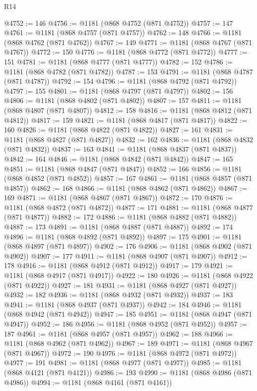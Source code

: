 \begin{lexlean}{R14}
\begin{coremodule}
@4752 := 146
@4756 := @1181 (@868 @4752 (@871 @4752))
@4757 := 147
@4761 := @1181 (@868 @4757 (@871 @4757))
@4762 := 148
@4766 := @1181 (@868 @4762 (@871 @4762))
@4767 := 149
@4771 := @1181 (@868 @4767 (@871 @4767))
@4772 := 150
@4776 := @1181 (@868 @4772 (@871 @4772))
@4777 := 151
@4781 := @1181 (@868 @4777 (@871 @4777))
@4782 := 152
@4786 := @1181 (@868 @4782 (@871 @4782))
@4787 := 153
@4791 := @1181 (@868 @4787 (@871 @4787))
@4792 := 154
@4796 := @1181 (@868 @4792 (@871 @4792))
@4797 := 155
@4801 := @1181 (@868 @4797 (@871 @4797))
@4802 := 156
@4806 := @1181 (@868 @4802 (@871 @4802))
@4807 := 157
@4811 := @1181 (@868 @4807 (@871 @4807))
@4812 := 158
@4816 := @1181 (@868 @4812 (@871 @4812))
@4817 := 159
@4821 := @1181 (@868 @4817 (@871 @4817))
@4822 := 160
@4826 := @1181 (@868 @4822 (@871 @4822))
@4827 := 161
@4831 := @1181 (@868 @4827 (@871 @4827))
@4832 := 162
@4836 := @1181 (@868 @4832 (@871 @4832))
@4837 := 163
@4841 := @1181 (@868 @4837 (@871 @4837))
@4842 := 164
@4846 := @1181 (@868 @4842 (@871 @4842))
@4847 := 165
@4851 := @1181 (@868 @4847 (@871 @4847))
@4852 := 166
@4856 := @1181 (@868 @4852 (@871 @4852))
@4857 := 167
@4861 := @1181 (@868 @4857 (@871 @4857))
@4862 := 168
@4866 := @1181 (@868 @4862 (@871 @4862))
@4867 := 169
@4871 := @1181 (@868 @4867 (@871 @4867))
@4872 := 170
@4876 := @1181 (@868 @4872 (@871 @4872))
@4877 := 171
@4881 := @1181 (@868 @4877 (@871 @4877))
@4882 := 172
@4886 := @1181 (@868 @4882 (@871 @4882))
@4887 := 173
@4891 := @1181 (@868 @4887 (@871 @4887))
@4892 := 174
@4896 := @1181 (@868 @4892 (@871 @4892))
@4897 := 175
@4901 := @1181 (@868 @4897 (@871 @4897))
@4902 := 176
@4906 := @1181 (@868 @4902 (@871 @4902))
@4907 := 177
@4911 := @1181 (@868 @4907 (@871 @4907))
@4912 := 178
@4916 := @1181 (@868 @4912 (@871 @4912))
@4917 := 179
@4921 := @1181 (@868 @4917 (@871 @4917))
@4922 := 180
@4926 := @1181 (@868 @4922 (@871 @4922))
@4927 := 181
@4931 := @1181 (@868 @4927 (@871 @4927))
@4932 := 182
@4936 := @1181 (@868 @4932 (@871 @4932))
@4937 := 183
@4941 := @1181 (@868 @4937 (@871 @4937))
@4942 := 184
@4946 := @1181 (@868 @4942 (@871 @4942))
@4947 := 185
@4951 := @1181 (@868 @4947 (@871 @4947))
@4952 := 186
@4956 := @1181 (@868 @4952 (@871 @4952))
@4957 := 187
@4961 := @1181 (@868 @4957 (@871 @4957))
@4962 := 188
@4966 := @1181 (@868 @4962 (@871 @4962))
@4967 := 189
@4971 := @1181 (@868 @4967 (@871 @4967))
@4972 := 190
@4976 := @1181 (@868 @4972 (@871 @4972))
@4977 := 191
@4981 := @1181 (@868 @4977 (@871 @4977))
@4985 := @1181 (@868 @4121 (@871 @4121))
@4986 := 193
@4990 := @1181 (@868 @4986 (@871 @4986))
@4994 := @1181 (@868 @4161 (@871 @4161))

\end{coremodule}
\end{lexlean}
